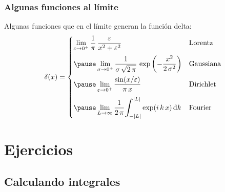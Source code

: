 \documentclass[12pt]{beamer}
\begin{document}
\begin{frame}
\frametitle{Algunas funciones al límite}
Algunas funciones que en el límite generan la función delta:
\pause
\begin{eqnarray*}
\begin{aligned}
\delta(x) = \begin{cases}
\displaystyle
\lim_{\varepsilon \to 0^{+}} \dfrac{1}{\pi} \, \dfrac{\varepsilon}{x^{2} + \varepsilon^{2}} & \mbox{Lorentz} \\[1em] \pause 
\displaystyle
\lim_{\sigma \to 0^{+}} \dfrac{1}{\sigma \, \sqrt{2 \, \pi}} \, \exp \left( - \dfrac{x^{2}}{2 \, \sigma^{2}} \right) & \mbox{Gaussiana} \\[1em] \pause
\displaystyle \lim_{\varepsilon \to 0^{+}} \dfrac{\sin(x / \varepsilon)}{ \pi \, x} & \mbox{Dirichlet} \\[1em] \pause
\displaystyle \lim_{L \to \infty} \dfrac{1}{2 \, \pi} \scaleint{6ex}_{\bs - \abs{L}}^{\abs{L}} \exp(i \, k \, x) \dd{k} & \mbox{Fourier}
\end{cases}
\end{aligned}
\end{eqnarray*}
\end{frame}

\section{Ejercicios}
\subsection{Calculando integrales}
\end{document}
